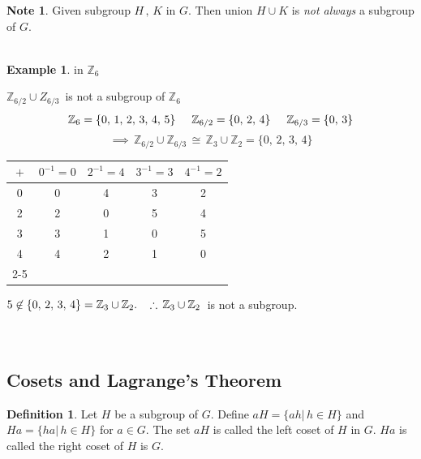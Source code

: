 \documentclass[11pt,a4paper]{article}
\theoremstyle{definition}
\newtheorem{defn}[thm]{Definition}
\newtheorem{exa}[thm]{Example}
\newtheorem*{note}{Note}
\begin{document}
\begin{note}
Given subgroup $H\, , \, K$ in $G$. Then union $H\cup K$ is \textit{not always} a subgroup of $G$.\\\\
\end{note}





\begin{exa}
in $\mathbb{Z}_6$\\
\end{exa}

$\mathbb{Z}_{6/2}\cup Z_{6/3}\, $ is not a subgroup of $\mathbb{Z}_6$
$$\mathbb{Z}_6 = \{0,\, 1,\, 2,\, 3,\, 4, \, 5\}\hspace{0.5cm} \mathbb{Z}_{6/2}= \{0,\, 2,\, 4\}\hspace{0.5cm} \mathbb{Z}_{6/3} = \{0,\, 3\}$$
$$\implies \, \mathbb{Z}_{6/2}\cup \mathbb{Z}_{6/3} \, \cong \, \mathbb{Z}_3\cup \mathbb{Z}_2 = \{0,\, 2, \, 3,\, 4\}$$
\begin{table}[H]
\centering
\begin{tabular}{c|c|c|c|c|}
$+$ & $0^{-1} = 0$ & $2^{-1} = 4$ & $3^{-1} = 3$ & $4^{-1} = 2$\\
\hline
0 & 0 & 4 & 3 & 2\\
2 & 2 & 0 & 5 & 4\\
3 & 3 & 1 & 0 & 5\\
4 & 4 & 2 & 1 & 0\\
\cline{2-5}
\end{tabular}
\end{table}

$5\not\in \{0,\, 2,\, 3,\,4\} = \mathbb{Z}_3\cup \mathbb{Z}_2.\hspace{0.3cm} \therefore\, \mathbb{Z}_3\cup \mathbb{Z}_2\,$ is not a subgroup.\\\\\\














\subsection{Cosets and Lagrange's Theorem}


\begin{defn}
Let $H$ be a subgroup of $G$. Define $aH = \{ah|\, h\in H\}$ and $Ha = \{ha|\, h\in H\}$ for $a\in G$. The set $aH$ is called the left coset of $H$ in $G$. $Ha$ is called the right coset of $H$ is $G$.\\\\
\end{defn}
\end{document}

